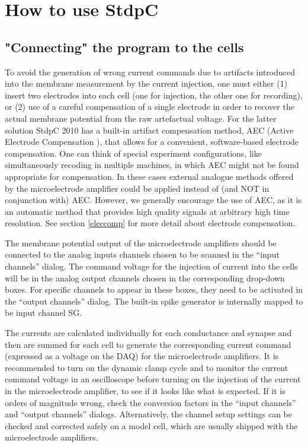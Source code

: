 \documentclass{article}
\begin{document}
\section{How to use StdpC}

\subsection{"Connecting" the program to the cells}
 
To avoid the generation of wrong current commands due to artifacts
introduced into the membrane measurement by the current injection,
one must either (1) insert two electrodes into each cell (one for
injection, the other one for recording), or
(2) use of a careful compensation of a single electrode in order to recover the
actual membrane potential from the raw artefactual voltage. For the
latter solution StdpC 2010 has a built-in artifact compensation method, AEC
(Active Electrode Compensation \cite{Brette2008}), that allows for a
convenient, software-based electrode compensation. One can think of
special experiment configurations, like simultaneously recoding in multiple
machines, in which AEC might not be found appropriate for compensation. In
these cases external analogue methods offered by the microelectrode amplifier could
be applied instead of (and NOT in conjunction with) AEC. However, we
generally encourage the use of AEC, as it is an automatic method
that provides high quality signals at arbitrary high time resolution.
See section \ref{eleccomp} for more detail about electrode compensation.

The membrane potential output of the microelectrode amplifiers should
be connected to the analog inputs channels chosen to be scanned in the
``input channels'' dialog. The command voltage for the injection of
current into the cells will be in the analog output channels chosen in
the corresponding drop-down boxes. For specific channels to appear in
these boxes, they need to be activated in the ``output channels''
dialog. The built-in spike generator is internally mapped to be input
channel SG. 

The currents are calculated individually for each conductance and
synapse and then are summed for each cell to generate the
corresponding current command (expressed as a voltage on the DAQ) for
the microelectrode amplifiers. It is 
recommended to turn on the dynamic clamp cycle and to monitor the
current command voltage in an oscilloscope before turning on the
injection of the current in the microelectrode amplifier, to see if it
looks like what is expected. If it is orders of magnitude wrong, check
the conversion factors in the ``input channels'' and ``output
channels'' dialogs. Alternatively, the channel setup settings can be checked and
corrected safely on a model cell, which are usually shipped with the
microelectrode amplifiers.
 
\end{document}
